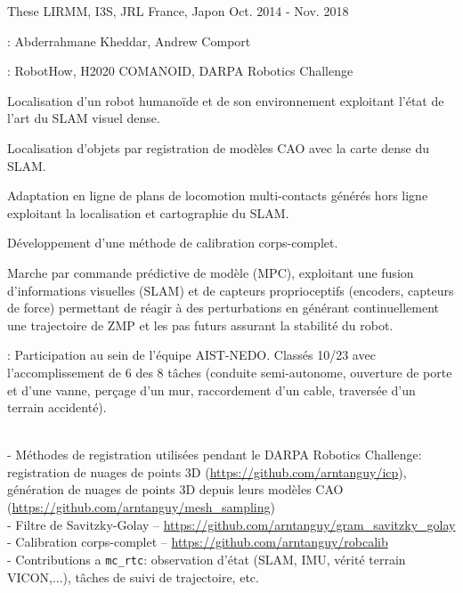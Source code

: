 \begin{cventries}
  \cventry
    {These} %
    {LIRMM, I3S, JRL} %
    {France, Japon} %
    {Oct. 2014 - Nov. 2018} %
    {
      \begin{cvitems} %
        \item {}: Abderrahmane Kheddar, Andrew Comport 
        \item {}: RobotHow, H2020 COMANOID, DARPA Robotics Challenge
        \item Localisation d'un robot humanoïde et de son environnement exploitant l'état de l'art du SLAM visuel dense.
        \item Localisation d'objets par registration de modèles CAO avec la carte dense du SLAM.
        \item Adaptation en ligne de plans de locomotion multi-contacts générés hors ligne exploitant la localisation et cartographie du SLAM.
        \item Développement d'une méthode de calibration corps-complet. 
        \item Marche par commande prédictive de modèle (MPC), exploitant une fusion d'informations visuelles (SLAM) et de capteurs proprioceptifs (encoders, capteurs de force) permettant de réagir à des perturbations en générant continuellement une trajectoire de ZMP et les pas futurs assurant la stabilité du robot.
        \item {}: Participation au sein de l'équipe AIST-NEDO. Classés 10/23 avec l'accomplissement de 6 des 8 tâches (conduite semi-autonome, ouverture de porte et d'une vanne, perçage d'un mur, raccordement d'un cable, traversée d'un terrain accidenté).
        \item {}\\
          - Méthodes de registration utilisées pendant le DARPA Robotics Challenge: registration de nuages de points 3D (\url{https://github.com/arntanguy/icp}), génération de nuages de points 3D depuis leurs modèles CAO (\url{https://github.com/arntanguy/mesh\_sampling})\\
          - Filtre de Savitzky-Golay -- \url{https://github.com/arntanguy/gram_savitzky_golay}\\
          - Calibration corps-complet -- \url{https://github.com/arntanguy/robcalib}\\
          - Contributions a {\tt mc\_rtc}: observation d'état (SLAM, IMU, vérité terrain VICON,...), tâches de suivi de trajectoire, etc.
      \end{cvitems}
    }


\end{cventries}
